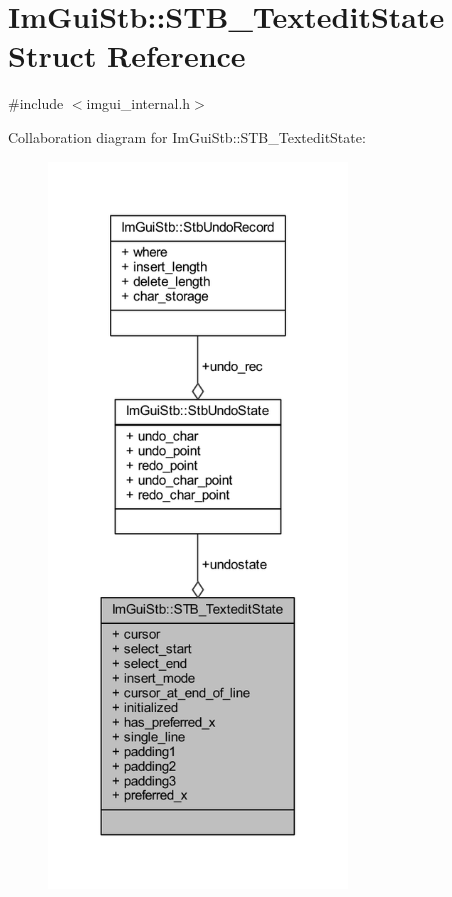 \hypertarget{struct_im_gui_stb_1_1_s_t_b___textedit_state}{}\section{Im\+Gui\+Stb\+:\+:S\+T\+B\+\_\+\+Textedit\+State Struct Reference}
\label{struct_im_gui_stb_1_1_s_t_b___textedit_state}


{\ttfamily \#include $<$imgui\+\_\+internal.\+h$>$}



Collaboration diagram for Im\+Gui\+Stb\+:\+:S\+T\+B\+\_\+\+Textedit\+State\+:
\nopagebreak
\begin{figure}[H]
\begin{center}
\leavevmode
\includegraphics[width=225pt]{struct_im_gui_stb_1_1_s_t_b___textedit_state__coll__graph}
\end{center}
\end{figure}
